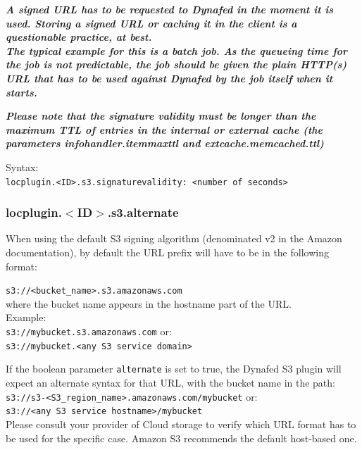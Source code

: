 \documentclass[12pt]{article} %
\begin{document}
\textit{\textbf{A signed URL has to be requested to Dynafed in the moment it is used. Storing a signed URL or caching it in the client
is a questionable practice, at best.\\
The typical example for this is a batch job. As the queueing time for the job is not predictable, the job should
be given the plain HTTP(s) URL that has to be used against Dynafed by the job itself when it starts.\\}}


\textit{\textbf{Please note that the signature validity must be longer than the maximum TTL of entries in the
internal or external cache (the parameters infohandler.itemmaxttl and extcache.memcached.ttl)\\}}


Syntax:\\
\lstinline"locplugin.<ID>.s3.signaturevalidity: <number of seconds>"\\

\subsubsection{locplugin.$<$ID$>$.s3.alternate}
When using the default S3 signing algorithm (denominated v2 in the Amazon documentation), by default the URL prefix will have to be in the following format:

\lstinline"s3://<bucket_name>.s3.amazonaws.com"\\

where the bucket name appears in the hostname part of the URL.\\

Example:\\

\lstinline"s3://mybucket.s3.amazonaws.com"    or: \\
\lstinline"s3://mybucket.<any S3 service domain>"

 
If the boolean parameter \lstinline"alternate" is set to true, the Dynafed S3 plugin
will expect an alternate syntax for that URL, with the bucket name in the path:\\
 
\lstinline"s3://s3-<S3_region_name>.amazonaws.com/mybucket"    or: \\
\lstinline"s3://<any S3 service hostname>/mybucket"\\

Please consult your provider of Cloud storage to verify which URL format has to be used for the specific case. Amazon S3 recommends the default host-based one.\\
\end{document}
